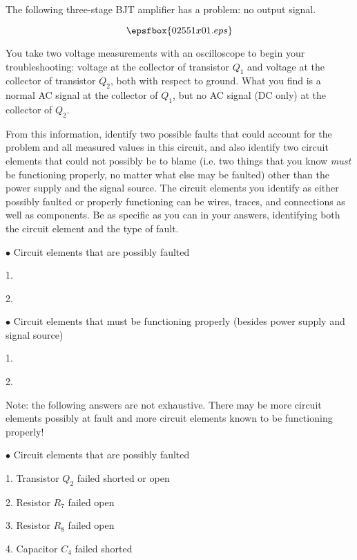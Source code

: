 

The following three-stage BJT amplifier has a problem: no output signal.

$$\epsfbox{02551x01.eps}$$

You take two voltage measurements with an oscilloscope to begin your troubleshooting: voltage at the collector of transistor $Q_1$ and voltage at the collector of transistor $Q_2$, both with respect to ground.  What you find is a normal AC signal at the collector of $Q_1$, but no AC signal (DC only) at the collector of $Q_2$.

From this information, identify two possible faults that could account for the problem and all measured values in this circuit, and also identify two circuit elements that could not possibly be to blame (i.e. two things that you know {\it must} be functioning properly, no matter what else may be faulted) other than the power supply and the signal source.  The circuit elements you identify as either possibly faulted or properly functioning can be wires, traces, and connections as well as components.  Be as specific as you can in your answers, identifying both the circuit element and the type of fault.

\medskip
\goodbreak
\item{$\bullet$} Circuit elements that are possibly faulted
\item{1.}
\item{2.} 
\medskip

\medskip
\goodbreak
\item{$\bullet$} Circuit elements that must be functioning properly (besides power supply and signal source)
\item{1.} 
\item{2.} 
\medskip







Note: the following answers are not exhaustive.  There may be more circuit elements possibly at fault and more circuit elements known to be functioning properly!

\medskip
\goodbreak
\item{$\bullet$} Circuit elements that are possibly faulted
\item{1.} Transistor $Q_2$ failed shorted or open
\item{2.} Resistor $R_7$ failed open
\item{3.} Resistor $R_8$ failed open
\item{4.} Capacitor $C_4$ failed shorted
\medskip

